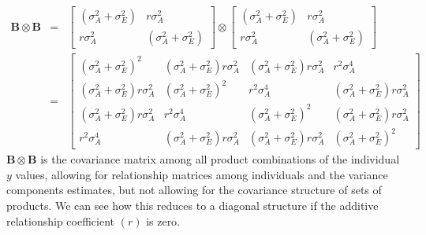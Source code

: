\documentclass[titlepage]{article}  %
\begin{document}
\begin{eqnarray}
\bm{B} \otimes \bm{B} & = & \begin{bmatrix} (\sigma^{2}_{A} + \sigma^{2}_{E}) & r \sigma^{2}_{A} \\ r \sigma^{2}_{A} & (\sigma^{2}_{A} + \sigma^{2}_{E}) \end{bmatrix}
\otimes
\begin{bmatrix} (\sigma^{2}_{A} + \sigma^{2}_{E}) & r \sigma^{2}_{A} \\ r \sigma^{2}_{A} & (\sigma^{2}_{A} + \sigma^{2}_{E}) \end{bmatrix} \\
    & = & \begin{bmatrix} (\sigma^{2}_{A} + \sigma^{2}_{E})^{2} & (\sigma^{2}_{A} + \sigma^{2}_{E})r \sigma^{2}_{A} & (\sigma^{2}_{A} + \sigma^{2}_{E})r \sigma^{2}_{A} & r^{2} \sigma^{4}_{A}\\ 
 (\sigma^{2}_{A} + \sigma^{2}_{E})r \sigma^{2}_{A} & (\sigma^{2}_{A} + \sigma^{2}_{E})^{2} & r^{2} \sigma^{4}_{A} & (\sigma^{2}_{A} + \sigma^{2}_{E})r \sigma^{2}_{A} \\
(\sigma^{2}_{A} + \sigma^{2}_{E})r \sigma^{2}_{A} & r^{2} \sigma^{4}_{A} & (\sigma^{2}_{A} + \sigma^{2}_{E})^{2} & (\sigma^{2}_{A} + \sigma^{2}_{E})r \sigma^{2}_{A} \\
r^{2} \sigma^{4}_{A} & (\sigma^{2}_{A} + \sigma^{2}_{E})r \sigma^{2}_{A} & (\sigma^{2}_{A} + \sigma^{2}_{E})r \sigma^{2}_{A} & (\sigma^{2}_{A} + \sigma^{2}_{E})^{2} \end{bmatrix}
\end{eqnarray}
 $\bm{B} \otimes \bm{B}$ is the covariance matrix among all product combinations of the individual $y$ values, allowing for relationship matrices among individuals and the variance components estimates, but not allowing for the covariance structure of sets of products. We can see how this reduces to a diagonal structure if the additive relationship coefficient $(r)$ is zero. 
\end{document}

